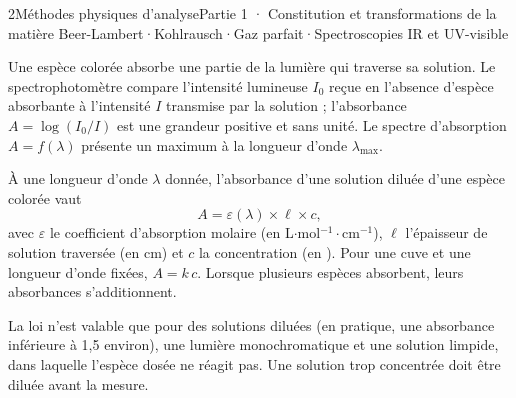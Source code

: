 \begin{ouverture}[spectre]{2}{Méthodes physiques d'analyse}{Partie 1 · Constitution et transformations de la matière}
{Beer-Lambert\enspace·\enspace Kohlrausch\enspace·\enspace Gaz parfait\enspace·\enspace Spectroscopies IR et UV-visible}
\end{ouverture}
\essentiel
{}
\begin{definition}[Absorbance]
Une espèce colorée absorbe une partie de la lumière qui traverse sa solution. Le spectrophotomètre
compare l'intensité lumineuse $I_0$ reçue en l'absence d'espèce absorbante à l'intensité $I$ transmise par la
solution ; l'absorbance $A=\log\left(I_0/I\right)$ est une grandeur positive et sans unité. Le spectre
d'absorption $A=f(\lambda)$ présente un maximum à la longueur d'onde $\lambda_{\max}$.
\end{definition}
\begin{loi}
À une longueur d'onde $\lambda$ donnée, l'absorbance d'une solution diluée d'une espèce colorée vaut
\[A=\varepsilon(\lambda)\times\ell\times c,\]
avec $\varepsilon$ le coefficient d'absorption molaire (en L$\cdot$mol$^{-1}\cdot$cm$^{-1}$), $\ell$ l'épaisseur de
solution traversée (en cm) et $c$ la concentration (en \molL). Pour une cuve et une longueur d'onde fixées,
$A=k\,c$. Lorsque plusieurs espèces absorbent, leurs absorbances s'additionnent.
\end{loi}
\begin{attention}
La loi n'est valable que pour des solutions diluées (en pratique, une absorbance inférieure à 1,5 environ),
une lumière monochromatique et une solution limpide, dans laquelle l'espèce dosée ne réagit pas.
Une solution trop concentrée doit être diluée avant la mesure.
\end{attention}
